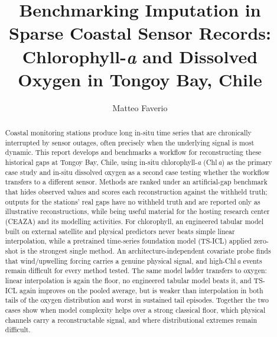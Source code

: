 \documentclass[11pt, a4paper]{article}
\title{
  Benchmarking Imputation in Sparse Coastal Sensor Records:\\
  Chlorophyll-\textit{a} and Dissolved Oxygen in Tongoy Bay, Chile
}
\author{
  Matteo Faverio
}
\date{}
\newcommand{\chl}{Chl\,\textit{a}}
\begin{document}
\maketitle

\begin{abstract}
  Coastal monitoring stations produce long in-situ time series that are chronically interrupted by
  sensor outages, often precisely when the underlying signal is most dynamic. This report develops
  and benchmarks a workflow for reconstructing these historical gaps at Tongoy Bay, Chile, using
  in-situ chlorophyll-\textit{a} (\chl{}) as the primary case study and in-situ dissolved oxygen as a second case testing whether the workflow transfers to a
  different sensor. Methods are ranked under an artificial-gap benchmark that hides observed values
  and scores each reconstruction against the withheld truth; outputs for the stations' real gaps
  have no withheld truth and are reported only as illustrative reconstructions, while being useful material for the hosting research center (CEAZA) and its modelling activities. For chlorophyll, an
  engineered tabular model built on external satellite and physical predictors never beats simple
  linear interpolation, while a pretrained time-series foundation model (TS-ICL) applied zero-shot
  is the strongest single method. An architecture-independent covariate probe finds that wind/upwelling forcing
  carries a genuine physical signal, and high-\chl{} events remain difficult for every method tested. The same model ladder transfers to oxygen: linear
  interpolation is again the floor, no engineered tabular model beats it, and TS-ICL again improves
  on the pooled average, but is weaker than interpolation in both tails of the oxygen distribution and worst in sustained
  tail episodes. Together the two cases show when model complexity helps over a strong classical floor, which physical channels carry a reconstructable signal, and where distributional extremes
  remain difficult.
\end{abstract}



\newpage

\newpage

\newpage

\newpage

\newpage

\newpage

\newpage

\newpage



\newpage

\appendix

\end{document}
